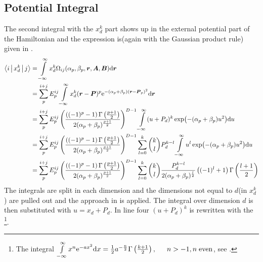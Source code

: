 \subsection{Potential Integral}
    The second integral with the $x^k_d$ part shows up in the external
    potential part of the Hamiltonian and the expression is(again with the
    Gaussian product rule) given in .
        \begin{align}
            \Braket{i|x^k_d|j} &= \int\limits^{\infty}_{-\infty} x^{k}_d
            \Omega_{ij}(\alpha_p,\beta_p,\boldsymbol{{r}},\boldsymbol{{A}},\boldsymbol{{B}}) \mathrm{d}
            \boldsymbol{{r}} \nonumber \\
            &= \sum\limits^{i+j}_{p} E^{ij}_{p} \int\limits^{\infty}_{-\infty} x^k_d (\boldsymbol{{r}}-\boldsymbol{{P}})^p
            \mathrm{e}^{-(\alpha_p+\beta_p)(\boldsymbol{{r}} - \boldsymbol{{P}}_p)^2} \mathrm{d} \boldsymbol{{r}}
            \nonumber \\
            &= \sum\limits^{i+j}_{p} E^{ij}_{p}
            \left(\frac{\left((-1)^p-1\right)\Gamma\left(\frac{p+1}{2}\right)}
            {2(\alpha_p+\beta_p)^{\frac{p+1}{2}}}\right)^{D-1} \int\limits^{\infty}_{-\infty}
            (u+P_d)^k\exp(-(\alpha_p+\beta_p)u^2) \mathrm{d} u \nonumber \\
            &= \sum\limits^{i+j}_{p} E^{ij}_{p}
            \left(\frac{\left((-1)^p-1\right)\Gamma\left(\frac{p+1}{2}\right)}
            {2(\alpha_p+\beta_p)^{\frac{p+1}{2}}}\right)^{D-1}
            \sum\limits_{l=0}^k {k\choose l} P^{k-l}_d \int\limits^{\infty}_{-\infty}
            u^l\exp(-(\alpha_p+\beta_p)u^2) \mathrm{d} u \nonumber \\
            &= \sum\limits^{i+j}_{p} E^{ij}_{p}
            \left(\frac{\left((-1)^p-1\right)\Gamma\left(\frac{p+1}{2}\right)}
            {2(\alpha_p+\beta_p)^{\frac{p+1}{2}}}\right)^{D-1}
            \sum\limits_{l=0}^k {k\choose l}
            \frac{P^{k-l}_d}{2(\alpha_p+\beta_p)^{\frac{l}{2}}}
            \left((-1)^l+1\right) \Gamma\left(\frac{l+1}{2}\right)
            \label{eq:potIntegral}
        \end{align}
    The integrals are split in each dimension and the dimensions not equal to
    $d$(in $x^k_d$) are pulled out and the approach in  is
    applied. The integral over dimension $d$ is then substituted with
    $u=x_d+P_d$. In line four $(u+P_d)^k$ is rewritten with the \footnote{The integral $\infint x^n\me^{-ax^2}\md x =
    \frac{1}{2}a^{-\frac{n}{2}}\Gamma\left(\frac{k+1}{2}\right),\indent n>-1,
    n\;\text{even}$, see \cite{handbookmath}.}.

